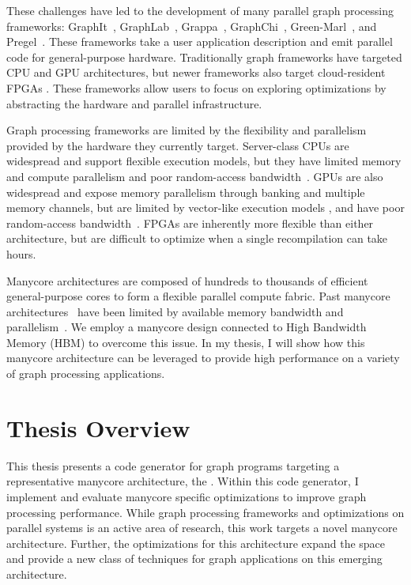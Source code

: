 These challenges have led to the development of many parallel graph processing frameworks: GraphIt~\cite{zhang2018graphit,brahmakshatriya2021compiling,zhang2019optimizing}, GraphLab~\cite{low2010graphlab, low2012distributed}, Grappa~\cite{nelson2015grappa}, GraphChi~\cite{aapo2012graphchi}, Green-Marl~\cite{hong2012green}, and Pregel~\cite{malewicz2010pregel}. 
These frameworks take a user application description and emit parallel code for general-purpose hardware.
Traditionally graph frameworks have targeted CPU and GPU architectures, but newer frameworks also target cloud-resident FPGAs \cite{engelhardt2016gravf, dai2016fpgp}.
These frameworks allow users to focus on exploring optimizations by abstracting the hardware and parallel infrastructure.

Graph processing frameworks are limited by the flexibility and parallelism provided by the hardware they currently target.
Server-class CPUs are widespread and support flexible execution models, but they have limited memory and compute parallelism and poor random-access bandwidth~\citep{beamer2015locality}.
GPUs are also widespread and expose memory parallelism through banking and multiple memory channels, but are limited by vector-like execution models \cite{xu2014graph, shi2018graph}, and have poor random-access bandwidth~\citep{aamodt2018general}.
FPGAs are inherently more flexible than either architecture, but are difficult to optimize when a single recompilation can take hours. 
  
Manycore architectures are composed of hundreds to thousands of efficient general-purpose cores to form a flexible parallel compute fabric.
Past manycore architectures~\cite{ramey2011tilera, agathos2015parallela, gwennap2011adapteva} have been limited by available memory bandwidth and parallelism~\citep{loi2010efficient}.  We employ a manycore design connected to High Bandwidth Memory (HBM) \cite{jedec2020hbm, jouppi2017datacenter} to overcome this issue.
In my thesis, I will show how this manycore architecture can be leveraged to provide high performance on a variety of graph processing applications.


\section{Thesis Overview}
This thesis presents a code generator for graph programs targeting a representative manycore architecture, the \hbmc. 
Within this code generator, I implement and evaluate manycore specific optimizations to improve graph processing performance. 
While graph processing frameworks and optimizations on parallel systems is an active area of research, this work targets a novel manycore architecture.
Further, the optimizations for this architecture expand the space and provide a new class of techniques for graph applications on this emerging architecture. 

